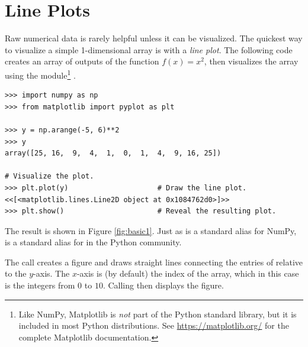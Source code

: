 
\section*{Line Plots} %

Raw numerical data is rarely helpful unless it can be visualized.
The quickest way to visualize a simple 1-dimensional array is with a \emph{line plot}.
The following code creates an array of outputs of the function $f(x) = x^2$, then visualizes the array using the  module\footnote{Like NumPy, Matplotlib is \emph{not} part of the Python standard library, but it is included in most Python distributions. See \url{https://matplotlib.org/} for the complete Matplotlib documentation.} \cite{Hunter:2007}.

\begin{lstlisting}
>>> import numpy as np
>>> from matplotlib import pyplot as plt

>>> y = np.arange(-5, 6)**2
>>> y
array([25, 16,  9,  4,  1,  0,  1,  4,  9, 16, 25])

# Visualize the plot.
>>> plt.plot(y)                     # Draw the line plot.
<<[<matplotlib.lines.Line2D object at 0x1084762d0>]>>
>>> plt.show()                      # Reveal the resulting plot.
\end{lstlisting}

The result is shown in Figure \ref{fig:basic1}.
Just as  is a standard alias for NumPy,  is a standard alias for  in the Python community.

The call  creates a figure and draws straight lines connecting the entries of  relative to the $y$-axis.
The $x$-axis is (by default) the index of the array, which in this case is the integers from $0$ to $10$.
Calling  then displays the figure.

